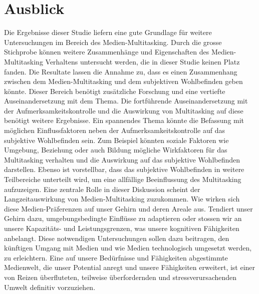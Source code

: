 \section{Ausblick}\label{section.diskussion.ausblick}
Die Ergebnisse dieser Studie liefern eine gute Grundlage für weitere Untersuchungen im Bereich des Medien-Multitasking. Durch die grosse Stichprobe können weitere Zusammenhänge und Eigenschaften des Medien-Multitasking Verhaltens untersucht werden, die in dieser Studie keinen Platz fanden. Die Resultate lassen die Annahme zu, dass es einen Zusammenhang zwischen dem Medien-Multitasking und dem subjektiven Wohlbefinden geben könnte. Dieser Bereich benötigt zusätzliche Forschung und eine vertiefte Auseinandersetzung mit dem Thema. Die fortführende Auseinandersetzung mit der Aufmerksamkeitskontrolle und die Auswirkung von Multitasking auf diese benötigt weitere Ergebnisse. Ein spannendes Thema könnte die Befassung mit möglichen Einflussfaktoren neben der Aufmerksamkeitskontrolle auf das subjektive Wohlbefinden sein. Zum Beispiel könnten soziale Faktoren wie Umgebung, Beziehung oder auch Bildung mögliche Wirkfaktoren für das Multitasking verhalten und die Auswirkung auf das subjektive Wohlbefinden darstellen. Ebenso ist vorstellbar, dass das subjektive Wohlbefinden in weitere Teilbereiche unterteilt wird, um eine allfällige Beeinflussung des Multitasking aufzuzeigen. Eine zentrale Rolle in dieser Diskussion scheint der Langzeitauswirkung von Medien-Multitasking zuzukommen. Wie wirken sich diese Medien-Präferenzen auf unser Gehirn und deren Areale aus. Tendiert unser Gehirn dazu, umgebungsbedingte Einflüsse zu adaptieren oder stossen wir an unsere Kapazitäts- und Leistungsgrenzen, was unsere kognitiven Fähigkeiten anbelangt. Diese notwendigen Untersuchungen sollen dazu beitragen, den künftigen Umgang mit Medien und wie Medien technologisch umgesetzt werden, zu erleichtern. Eine auf unsere Bedürfnisse und Fähigkeiten abgestimmte Medienwelt, die unser Potential anregt und unsere Fähigkeiten erweitert, ist einer von Reizen überfluteten, teilweise überfordernden und stressverursachenden Umwelt definitiv vorzuziehen. 


